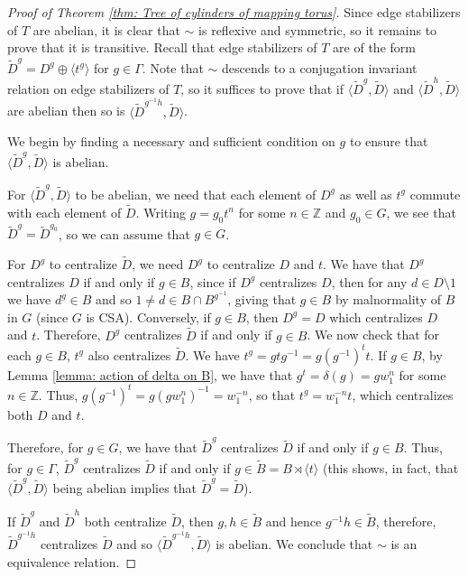 \documentclass{amsart}
\newcommand{\Z}{\mathbb{Z}}
\theoremstyle{plain}
\theoremstyle{definition}
\theoremstyle{remark}
\begin{document}
\begin{proof} [Proof of Theorem \ref{thm: Tree of cylinders of mapping torus}]
    Since edge stabilizers of $T$ are abelian, it is clear that $\sim$ is reflexive and symmetric, so it remains to prove that it is transitive. Recall that edge stabilizers of $T$ are of the form $\tilde{D}^g = D^g \oplus \langle t^g \rangle$ for $g \in \Gamma$. Note that $\sim$ descends to a conjugation invariant relation on edge stabilizers of $T$, so it suffices to prove that if $\langle \tilde{D}^g, \tilde{D}\rangle$ and $\langle \tilde{D}^h, \tilde{D}\rangle$ are abelian then so is $\langle \tilde{D}^{g^{-1}h}, \tilde{D}\rangle$. 

    We begin by finding a necessary and sufficient condition on $g$ to ensure that $\langle \tilde{D}^g, \tilde{D}\rangle$  is abelian. 

    For $\langle \tilde{D}^g, \tilde{D}\rangle$ to be abelian, we need that each element of $D^g$ as well as $t^g$ commute with each element of $\tilde{D}$. Writing $g = g_0 t^n$ for some $n \in \Z$ and $g_0 \in G$, we see that $\tilde{D}^g = \tilde{D}^{g_0}$, so we can assume that $g \in G$. 

    For $D^g$ to centralize $\tilde{D}$, we need $D^g$ to centralize $D$ and $t$. We have that $D^g$ centralizes $D$ if and only if $g \in B$, since if $D^g$ centralizes $D$, then for any $d \in D \setminus 1$ we have $d^g \in B$ and so $1 \neq d \in B \cap B^{g^{-1}}$, giving that $g \in B$ by malnormality of $B$ in $G$ (since $G$ is CSA). Conversely, if $g \in B$, then $D^g = D$ which centralizes $D$ and $t$. Therefore, $D^g$ centralizes $\tilde{D}$ if and only if $g \in B$. We now check that for each $g \in B$, $t^g$ also centralizes $\tilde{D}$. We have $t^g = gtg^{-1} = g(g^{-1})^t t$. If $g \in B$, by Lemma \ref{lemma: action of delta on B}, we have that $g^t = \delta(g) = g w_1^n$ for some $n \in \Z$. Thus, $g (g^{-1})^t = g (gw_1^n)^{-1} = w_1^{-n}$, so that $t^g = w_1^{-n} t$, which centralizes both $D$ and $t$. 

    Therefore, for $g \in G$, we have that $\tilde{D}^g$ centralizes $\tilde{D}$ if and only if $g \in B$. Thus, for $g \in \Gamma$, $\tilde{D}^g$ centralizes $\tilde{D}$ if and only if $g \in \tilde{B} = B \rtimes \langle t \rangle$ (this shows, in fact, that $\langle \tilde{D}^g, \tilde{D} \rangle$ being abelian implies that $\tilde{D}^g=\tilde{D}$). 

    If $\tilde{D}^g$ and $\tilde{D}^h$ both centralize $\tilde{D}$, then $g,h \in \tilde{B}$ and hence $g^{-1}h \in \tilde{B}$, therefore, $\tilde{D}^{g^{-1}h}$ centralizes $\tilde{D}$ and so $\langle \tilde{D}^{g^{-1}h}, \tilde{D} \rangle$ is abelian. We conclude that $\sim$ is an equivalence relation.
\end{proof}
\end{document}
